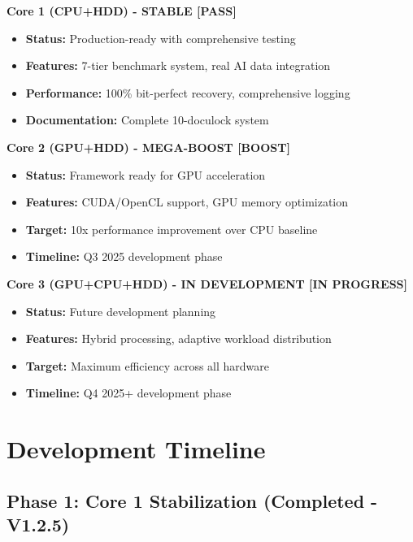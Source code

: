 \documentclass[12pt,a4paper]{article}
\begin{document}
\textbf{Core 1 (CPU+HDD) - STABLE [PASS]}
\begin{itemize}
    \item \textbf{Status:} Production-ready with comprehensive testing
    \item \textbf{Features:} 7-tier benchmark system, real AI data integration
    \item \textbf{Performance:} 100\% bit-perfect recovery, comprehensive logging
    \item \textbf{Documentation:} Complete 10-doculock system
\end{itemize}

\textbf{Core 2 (GPU+HDD) - MEGA-BOOST [BOOST]}
\begin{itemize}
    \item \textbf{Status:} Framework ready for GPU acceleration
    \item \textbf{Features:} CUDA/OpenCL support, GPU memory optimization
    \item \textbf{Target:} 10x performance improvement over CPU baseline
    \item \textbf{Timeline:} Q3 2025 development phase
\end{itemize}

\textbf{Core 3 (GPU+CPU+HDD) - IN DEVELOPMENT [IN PROGRESS]}
\begin{itemize}
    \item \textbf{Status:} Future development planning
    \item \textbf{Features:} Hybrid processing, adaptive workload distribution
    \item \textbf{Target:} Maximum efficiency across all hardware
    \item \textbf{Timeline:} Q4 2025+ development phase
\end{itemize}

\section{Development Timeline}

\subsection{Phase 1: Core 1 Stabilization (Completed - V1.2.5)}
\end{document}
